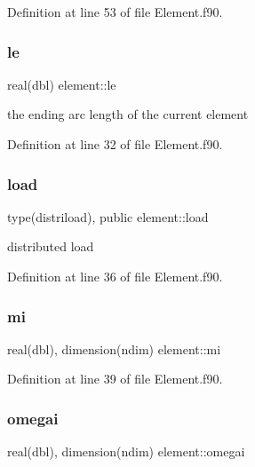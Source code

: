 Definition at line 53 of file Element.\+f90.

\mbox{\label{namespaceelement_a10e7976ce4185b147c590f281b7691b1}} 
\subsubsection{\texorpdfstring{le}{le}}
{\footnotesize\ttfamily real(dbl) element\+::le\hspace{0.3cm}{\ttfamily [private]}}



the ending arc length of the current element 



Definition at line 32 of file Element.\+f90.

\mbox{\label{namespaceelement_a99d2f733169debb6f9d7d8b30fbc49c4}} 
\subsubsection{\texorpdfstring{load}{load}}
{\footnotesize\ttfamily type(distriload), public element\+::load}



distributed load 



Definition at line 36 of file Element.\+f90.

\mbox{\label{namespaceelement_aaa8af943c974b60b3eeacd9ea685f28b}} 
\subsubsection{\texorpdfstring{mi}{mi}}
{\footnotesize\ttfamily real(dbl), dimension(ndim) element\+::mi\hspace{0.3cm}{\ttfamily [private]}}



Definition at line 39 of file Element.\+f90.

\mbox{\label{namespaceelement_ad819facefa1f1184a10576007ac79ba4}} 
\subsubsection{\texorpdfstring{omegai}{omegai}}
{\footnotesize\ttfamily real(dbl), dimension(ndim) element\+::omegai\hspace{0.3cm}{\ttfamily [private]}}



